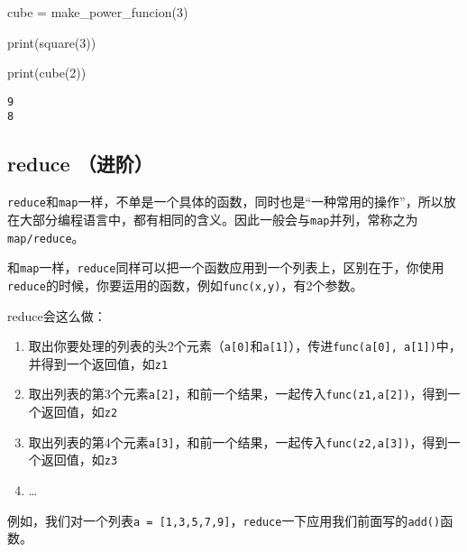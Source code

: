 \documentclass[
  letterpaper,
  DIV=11,
  numbers=noendperiod]{scrreprt}
\newenvironment{Shaded}{\begin{snugshade}}{\end{snugshade}}
\newcommand{\BuiltInTok}[1]{\textcolor[rgb]{0.00,0.23,0.31}{#1}}
\newcommand{\DecValTok}[1]{\textcolor[rgb]{0.68,0.00,0.00}{#1}}
\newcommand{\NormalTok}[1]{\textcolor[rgb]{0.00,0.23,0.31}{#1}}
\newcommand{\OperatorTok}[1]{\textcolor[rgb]{0.37,0.37,0.37}{#1}}
\providecommand{\tightlist}{%
  \setlength{\itemsep}{0pt}\setlength{\parskip}{0pt}}\usepackage{longtable,booktabs,array}
\begin{document}
\begin{Shaded}
\begin{Highlighting}[]
\NormalTok{cube }\OperatorTok{=}\NormalTok{ make\_power\_funcion(}\DecValTok{3}\NormalTok{)}
\end{Highlighting}
\end{Shaded}

\begin{Shaded}
\begin{Highlighting}[]
\BuiltInTok{print}\NormalTok{(square(}\DecValTok{3}\NormalTok{))}

\BuiltInTok{print}\NormalTok{(cube(}\DecValTok{2}\NormalTok{))}
\end{Highlighting}
\end{Shaded}

\begin{verbatim}
9
8
\end{verbatim}

\hypertarget{reduce-ux8fdbux9636}{%
\subsection{reduce （进阶）}\label{reduce-ux8fdbux9636}}

\texttt{reduce}和\texttt{map}一样，不单是一个具体的函数，同时也是``一种常用的操作''，所以放在大部分编程语言中，都有相同的含义。因此一般会与\texttt{map}并列，常称之为\texttt{map/reduce}。

和\texttt{map}一样，\texttt{reduce}同样可以把一个函数应用到一个列表上，区别在于，你使用\texttt{reduce}的时候，你要运用的函数，例如\texttt{func(x,y)}，有2个参数。

reduce会这么做：

\begin{enumerate}
\def\labelenumi{\arabic{enumi}.}
\tightlist
\item
  取出你要处理的列表的头2个元素（\texttt{a{[}0{]}}和\texttt{a{[}1{]}}），传进\texttt{func(a{[}0{]},\ a{[}1{]})}中，并得到一个返回值，如\texttt{z1}
\item
  取出列表的第3个元素\texttt{a{[}2{]}}，和前一个结果，一起传入\texttt{func(z1,a{[}2{]})}，得到一个返回值，如\texttt{z2}
\item
  取出列表的第4个元素\texttt{a{[}3{]}}，和前一个结果，一起传入\texttt{func(z2,a{[}3{]})}，得到一个返回值，如\texttt{z3}
\item
  \ldots{}
\end{enumerate}

例如，我们对一个列表\texttt{a\ =\ {[}1,3,5,7,9{]}}，\texttt{reduce}一下应用我们前面写的\texttt{add()}函数。
\end{document}
